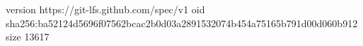 version https://git-lfs.github.com/spec/v1
oid sha256:ba52124d5696f07562bcac2b0d03a2891532074b454a75165b791d00d060b912
size 13617
